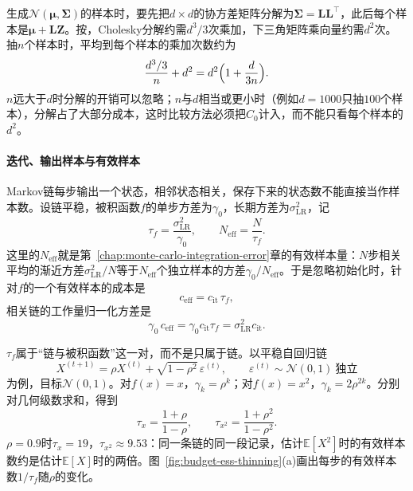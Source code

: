 生成$\mathcal{N}(\bm{\mu},\bm{\Sigma})$的样本时，要先把$d\times d$的协方差矩阵分解为$\bm{\Sigma}=\bm{L}\bm{L}^{\top}$，此后每个样本是$\bm{\mu}+\bm{L}\bm{Z}$。按，Cholesky分解约需$d^{3}/3$次乘加，下三角矩阵乘向量约需$d^{2}$次。抽$n$个样本时，平均到每个样本的乘加次数约为
\[
  \frac{d^{3}/3}{n}+d^{2}=d^{2}\Bigl(1+\frac{d}{3n}\Bigr).
\]
$n$远大于$d$时分解的开销可以忽略；$n$与$d$相当或更小时（例如$d=1000$只抽$100$个样本），分解占了大部分成本，这时比较方法必须把$C_{0}$计入，而不能只看每个样本的$d^{2}$。

\paragraph{迭代、输出样本与有效样本}
Markov链每步输出一个状态，相邻状态相关，保存下来的状态数不能直接当作样本数。设链平稳，被积函数$f$的单步方差为$\gamma_{0}$，长期方差为$\sigma_{\mathrm{LR}}^{2}$，记
\begin{equation}
  \tau_{f}=\frac{\sigma_{\mathrm{LR}}^{2}}{\gamma_{0}},\qquad N_{\mathrm{eff}}=\frac{N}{\tau_{f}} .
  \label{eq:budget-tau}
\end{equation}
这里的$N_{\mathrm{eff}}$就是第~\ref{chap:monte-carlo-integration-error}章的有效样本量：$N$步相关平均的渐近方差$\sigma_{\mathrm{LR}}^{2}/N$等于$N_{\mathrm{eff}}$个独立样本的方差$\gamma_{0}/N_{\mathrm{eff}}$。于是忽略初始化时，针对$f$的一个有效样本的成本是
\begin{equation}
  c_{\mathrm{eff}}=c_{\mathrm{it}}\,\tau_{f},
  \label{eq:budget-eff-cost}
\end{equation}
相关链的工作量归一化方差是
\[
  \gamma_{0}\,c_{\mathrm{eff}}=\gamma_{0}c_{\mathrm{it}}\tau_{f}=\sigma_{\mathrm{LR}}^{2}c_{\mathrm{it}} .
\]

$\tau_{f}$属于“链与被积函数”这一对，而不是只属于链。以平稳自回归链
\begin{equation}
  X^{(t+1)}=\rho X^{(t)}+\sqrt{1-\rho^{2}}\,\varepsilon^{(t)},\qquad\varepsilon^{(t)}\sim\mathcal{N}(0,1)\ \text{独立}
  \label{eq:budget-ar1}
\end{equation}
为例，目标$\mathcal{N}(0,1)$。对$f(x)=x$，$\gamma_{k}=\rho^{k}$；对$f(x)=x^{2}$，$\gamma_{k}=2\rho^{2k}$。分别对几何级数求和，得到
\[
  \tau_{x}=\frac{1+\rho}{1-\rho},\qquad\tau_{x^{2}}=\frac{1+\rho^{2}}{1-\rho^{2}} .
\]
$\rho=0.9$时$\tau_{x}=19$，$\tau_{x^{2}}\approx9.53$：同一条链的同一段记录，估计$\mathbb{E}[X^{2}]$时的有效样本数约是估计$\mathbb{E}[X]$时的两倍。图~\ref{fig:budget-ess-thinning}(a)画出每步的有效样本数$1/\tau_{f}$随$\rho$的变化。

